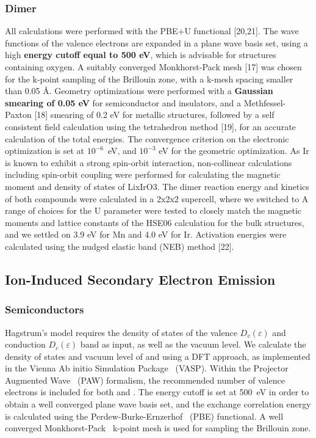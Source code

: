 \begin{refsection}
\subsubsection{Dimer} \label{appendix:sec-dimer} 
All calculations were performed with the PBE+U functional [20,21]. The wave 
functions of the valence electrons are expanded in a plane wave basis set, 
using a high \textbf{energy cutoff equal to 500 eV}, which is advisable for 
structures containing oxygen. A suitably converged Monkhorst-Pack mesh [17] 
was chosen for the k-point sampling of the Brillouin zone, with a k-mesh 
spacing smaller than 0.05 \AA. Geometry optimizations were performed with a 
\textbf{Gaussian smearing of 0.05 eV} for semiconductor and insulators, and a 
Methfessel-Paxton [18] smearing of 0.2 eV for metallic structures, followed by 
a self consistent field calculation using the tetrahedron method [19], for an 
accurate calculation of the total energies. The convergence criterion on the 
electronic optimization is set at $10^{-6}$~eV, and $10^{-3}$ eV for the 
geometric optimization. As Ir is known to exhibit a strong spin-orbit 
interaction, non-collinear calculations including spin-orbit coupling were 
performed for calculating the magnetic moment and density of states of 
LixIrO3. The dimer reaction energy and kinetics of both compounds were 
calculated in a 2x2x2 supercell, where we switched to  A range of choices for 
the U parameter were tested to closely match the magnetic moments and lattice 
constants of the HSE06 calculation for the bulk structures, and we settled on 
3.9 eV for Mn and 4.0 eV for Ir. Activation energies were calculated using the 
nudged elastic band (NEB) method [22].  
 
\subsection{Ion-Induced Secondary Electron Emission} \label{appendix:sec-quotas} 
 
\subsubsection{Semiconductors} \label{appendix:sec-semiconductors} 
 
Hagstrum's model requires the density of states of the valence 
$D_v(\varepsilon)$ and conduction $D_c(\varepsilon)$ band as input, as well as 
the vacuum level. We calculate the density of states and vacuum level of 
 and  using a DFT approach, as implemented in the 
Vienna Ab initio Simulation Package~\cite{Kresse1993, Kresse1994, Kresse1996, 
Kresse1996} (VASP). Within the Projector Augmented Wave~\cite{Blochl1994, 
Kresse1999} (PAW) formalism, the recommended number of valence electrons is 
included for both  and . The energy cutoff is set at 
500~\si{\electronvolt} in order to obtain a well converged plane wave basis 
set, and the exchange correlation energy is calculated using the 
Perdew-Burke-Ernzerhof~\cite{Perdew1996} (PBE) functional. A well converged 
Monkhorst-Pack~\cite{Monkhorst1976} k-point mesh is used for sampling the 
Brillouin zone.
 

\end{refsection}
